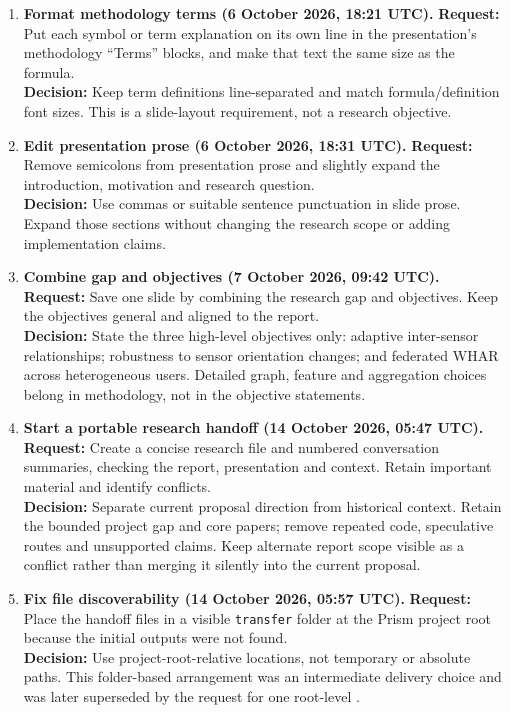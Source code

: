 \documentclass[10pt,a4paper]{article}
\begin{document}
\begin{enumerate}[label=\textbf{Step \arabic*.}]
\item \textbf{Format methodology terms (6 October 2026, 18:21 UTC).}
\textbf{Request:} Put each symbol or term explanation on its own line in the presentation's methodology ``Terms'' blocks, and make that text the same size as the formula.\\
\textbf{Decision:} Keep term definitions line-separated and match formula/definition font sizes. This is a slide-layout requirement, not a research objective.

\item \textbf{Edit presentation prose (6 October 2026, 18:31 UTC).}
\textbf{Request:} Remove semicolons from presentation prose and slightly expand the introduction, motivation and research question.\\
\textbf{Decision:} Use commas or suitable sentence punctuation in slide prose. Expand those sections without changing the research scope or adding implementation claims.

\item \textbf{Combine gap and objectives (7 October 2026, 09:42 UTC).}
\textbf{Request:} Save one slide by combining the research gap and objectives. Keep the objectives general and aligned to the report.\\
\textbf{Decision:} State the three high-level objectives only: adaptive inter-sensor relationships; robustness to sensor orientation changes; and federated WHAR across heterogeneous users. Detailed graph, feature and aggregation choices belong in methodology, not in the objective statements.

\item \textbf{Start a portable research handoff (14 October 2026, 05:47 UTC).}
\textbf{Request:} Create a concise research file and numbered conversation summaries, checking the report, presentation and context. Retain important material and identify conflicts.\\
\textbf{Decision:} Separate current proposal direction from historical context. Retain the bounded project gap and core papers; remove repeated code, speculative routes and unsupported claims. Keep alternate report scope visible as a conflict rather than merging it silently into the current proposal.

\item \textbf{Fix file discoverability (14 October 2026, 05:57 UTC).}
\textbf{Request:} Place the handoff files in a visible \texttt{transfer} folder at the Prism project root because the initial outputs were not found.\\
\textbf{Decision:} Use project-root-relative locations, not temporary or absolute paths. This folder-based arrangement was an intermediate delivery choice and was later superseded by the request for one root-level .


\end{enumerate}
\end{document}
